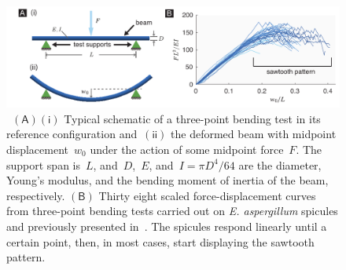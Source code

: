 \documentclass[preprint,10pt,times]{elsarticle}
\numberwithin{equation}{section}
\newcommand{\ndE}{E}
\newcommand{\ndL}{L}
\newcommand{\ndI}{I}
\newcommand{\pr}[1]{\left( #1 \right)}
\newcommand{\subf}[1]{\pr{\textsf{#1}}}
\begin{document}
\begin{figure}
\centering{}
\includegraphics[width=1\textwidth]{../Figures_Submit/SawtoothPatterns_V4.pdf}
\caption{\label{fig:sawtooth}~$\subf{A}$$\subf{i}$ Typical schematic of
a three-point bending test in its reference configuration and~$\subf{ii}$
the deformed beam with midpoint displacement~$w_0$ under the action of some midpoint force~$F$. %
The support span is~$\ndL$, and~$D$,~$\ndE$, and~$\ndI =\pi D^4/64$
are the diameter, Young's modulus, and the bending moment of inertia of
the beam, respectively. %
$\subf{B}$ Thirty eight scaled force-displacement
curves from three-point bending
tests carried out on \textit{E. aspergillum} spicules and previously presented in~\cite{monn2017enhanced,Sayaka2021Sawtooth}. %
The spicules respond linearly until a certain point, then, in most cases, start displaying the sawtooth pattern. %
}
\end{figure}
\end{document}
